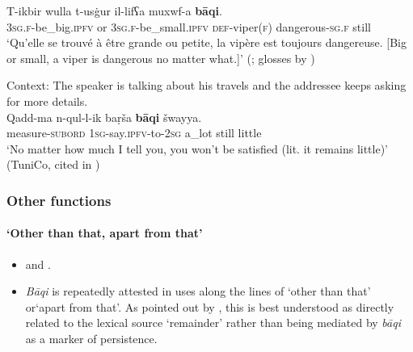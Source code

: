 \begin{exe}
	\ex \label{exAppendixTunisianBaqiConcessive1}
	\gll T-ikbir wulla t-usġur il-lifʕa muxwf-a \textbf{bāqi}.\\
	3\textsc{sg}.\textsc{f}-be\_big.\textsc{ipfv} or 3\textsc{sg}.\textsc{f}-be\_small.\textsc{ipfv} \textsc{def}-viper(\textsc{f}) dangerous-\textsc{sg}.\textsc{f} still\\
	\glt \lq Qu’elle se trouvé à être grande ou petite, la vipère est toujours dangereuse. [Big or small, a viper is dangerous no matter what.]\rq{ }(\cite[366]{MarcaisGuiga19581961}; glosses by \cite{FischerEtAlTunisian})
	
	\ex \label{exAppendixTunisianBaqiConcessive2}
	Context: The speaker is talking about his travels and the addressee keeps asking for more details.\\
	\gll Qadd-ma n-qul-l-ik baṛša \textbf{bāqi} šwayya.\\
	measure-\textsc{subord} 1\textsc{sg}-say.\textsc{ipfv}-to-2\textsc{sg} a\_lot still little\\
	\glt \lq No matter how much I tell you, you won’t be satisfied (lit. it remains little)’ (TuniCo, cited in \cite{FischerEtAlTunisian})
\end{exe}

\subsubsection{Other functions}
\paragraph{\lq{}Other than that, apart from that\rq}
\begin{itemize}
	\item \textcite{FischerEtAlTunisian} and \textcite{MarcaisGuiga19581961}.
	\item \textit{Bāqi} is repeatedly attested in uses along the lines of \lq other than that\rq{ }or\lq apart from that\rq{}. As pointed out by \textcite{FischerEtAlTunisian}, this is best understood as directly related to the lexical source \lq remainder\rq{ }rather than being mediated by \textit{bāqi} as a marker of persistence.
\end{itemize}


